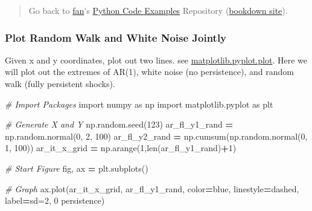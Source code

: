 \documentclass[
]{book}
\newenvironment{Shaded}{\begin{snugshade}}{\end{snugshade}}
\newcommand{\BuiltInTok}[1]{#1}
\newcommand{\CommentTok}[1]{\textcolor[rgb]{0.56,0.35,0.01}{\textit{#1}}}
\newcommand{\DecValTok}[1]{\textcolor[rgb]{0.00,0.00,0.81}{#1}}
\newcommand{\ImportTok}[1]{#1}
\newcommand{\NormalTok}[1]{#1}
\newcommand{\OperatorTok}[1]{\textcolor[rgb]{0.81,0.36,0.00}{\textbf{#1}}}
\newcommand{\StringTok}[1]{\textcolor[rgb]{0.31,0.60,0.02}{#1}}
\begin{document}
\begin{quote}
Go back to \href{http://fanwangecon.github.io/}{fan}'s \href{https://fanwangecon.github.io/pyfan/}{Python Code Examples} Repository (\href{https://fanwangecon.github.io/pyfan/bookdown}{bookdown site}).
\end{quote}

\hypertarget{plot-random-walk-and-white-noise-jointly}{%
\subsubsection{Plot Random Walk and White Noise Jointly}\label{plot-random-walk-and-white-noise-jointly}}

Given x and y coordinates, plot out two lines. see \href{https://matplotlib.org/2.1.1/api/_as_gen/matplotlib.pyplot.plot.html}{matplotlib.pyplot.plot}. Here we will plot out the extremes of AR(1), white noise (no persistence), and random walk (fully persistent shocks).

\begin{Shaded}
\begin{Highlighting}[]
\CommentTok{\# Import Packages}
\ImportTok{import}\NormalTok{ numpy }\ImportTok{as}\NormalTok{ np}
\ImportTok{import}\NormalTok{ matplotlib.pyplot }\ImportTok{as}\NormalTok{ plt}

\CommentTok{\# Generate X and Y}
\NormalTok{np.random.seed(}\DecValTok{123}\NormalTok{)}
\NormalTok{ar\_fl\_y1\_rand }\OperatorTok{=}\NormalTok{ np.random.normal(}\DecValTok{0}\NormalTok{, }\DecValTok{2}\NormalTok{, }\DecValTok{100}\NormalTok{)}
\NormalTok{ar\_fl\_y2\_rand }\OperatorTok{=}\NormalTok{ np.cumsum(np.random.normal(}\DecValTok{0}\NormalTok{, }\DecValTok{1}\NormalTok{, }\DecValTok{100}\NormalTok{))}
\NormalTok{ar\_it\_x\_grid }\OperatorTok{=}\NormalTok{ np.arange(}\DecValTok{1}\NormalTok{,}\BuiltInTok{len}\NormalTok{(ar\_fl\_y1\_rand)}\OperatorTok{+}\DecValTok{1}\NormalTok{)}

\CommentTok{\# Start Figure}
\NormalTok{fig, ax }\OperatorTok{=}\NormalTok{ plt.subplots()}

\CommentTok{\# Graph}
\NormalTok{ax.plot(ar\_it\_x\_grid, ar\_fl\_y1\_rand,}
\NormalTok{                     color}\OperatorTok{=}\StringTok{\textquotesingle{}blue\textquotesingle{}}\NormalTok{, linestyle}\OperatorTok{=}\StringTok{\textquotesingle{}dashed\textquotesingle{}}\NormalTok{,}
\NormalTok{                     label}\OperatorTok{=}\StringTok{\textquotesingle{}sd=2, 0 persistence\textquotesingle{}}\NormalTok{)}
\end{Highlighting}
\end{Shaded}
\end{document}
